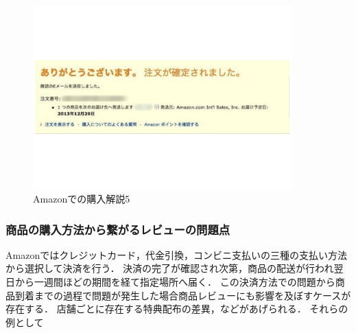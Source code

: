 \begin{enumerate}
\begin{figure}[htb]
\centering
\includegraphics[width=10cm]{kensakuhouhou5.pdf}
\caption{Amazonでの購入解説5}
\label{Amazonでの購入解説5}
\end{figure}


\end{enumerate}




\clearpage




\subsubsection{商品の購入方法から繋がるレビューの問題点}

Amazonではクレジットカード，代金引換，コンビニ支払いの三種の支払い方法から選択して決済を行う．
決済の完了が確認され次第，商品の配送が行われ翌日から一週間ほどの期間を経て指定場所へ届く．
この決済方法での問題から商品到着までの過程で問題が発生した場合商品レビューにも影響を及ぼすケースが存在する．
店舗ごとに存在する特典配布の差異，などがあげられる．
それらの例として


